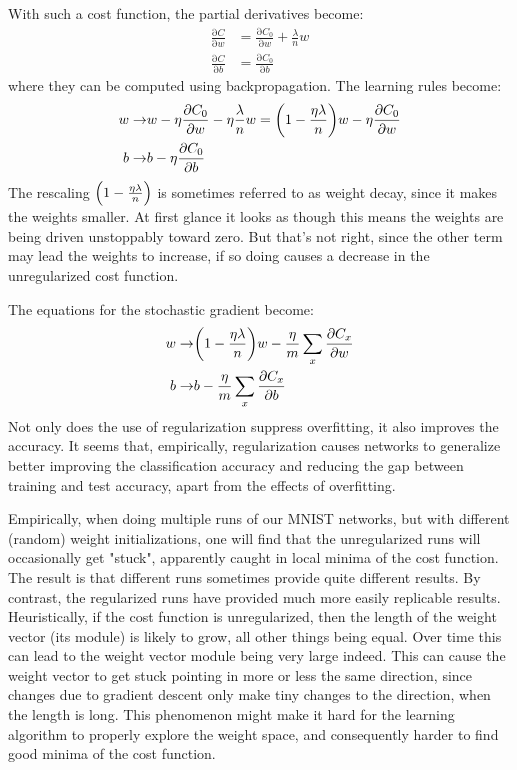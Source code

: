 \documentclass[12pt, letterpaper]{article}
\theoremstyle{definition}
\DeclarePairedDelimiter\autobracket{(}{)}
\newcommand{\br}[1]{\autobracket*{#1}}
\newcommand{\pr}{\mathrm{\partial}}
\begin{document}
With such a cost function, the partial derivatives become:
\begin{equation}
\begin{aligned}
\frac{\pr C}{\pr w} &=\frac{\pr C_0}{\pr w}  + \frac{\lambda}{n} w \\
\frac{\pr C}{\pr b} &=\frac{\pr C_0}{\pr b}
\end{aligned}
\end{equation}
where they can be computed using backpropagation. The learning rules become:
\begin{equation}
\begin{aligned}
w\rightarrow &w -\eta \frac{\pr C_0}{\pr w} -\eta \frac{\lambda}{n} w = \br{1-\frac{\eta\lambda}{n}}w-\eta \frac{\pr C_0}{\pr w} \\
b\rightarrow &b- \eta \frac{\pr C_0}{\pr b}
\end{aligned}
\end{equation}
The rescaling $\br{1-\frac{\eta\lambda}{n}}$ is sometimes referred to as weight decay, since it makes the weights smaller. At first glance it looks as though this means the weights are being driven unstoppably toward zero. But that's not right, since the other term may lead the weights to increase, if so doing causes a decrease in the unregularized cost function.

The equations for the stochastic gradient become:
\begin{equation}
\begin{aligned}
w\rightarrow & \br{1-\frac{\eta\lambda}{n}}w-\frac{\eta}{m} \sum_x\frac{\pr C_x}{\pr w} \\
b\rightarrow &b-\frac{\eta}{m} \sum_x\frac{\pr C_x}{\pr b}
\end{aligned}
\end{equation}
Not only does the use of regularization suppress overfitting, it also improves the accuracy. It seems that, empirically, regularization causes networks to generalize better improving the classification accuracy and reducing the gap between training and test accuracy, apart from the effects of overfitting.

Empirically, when doing multiple runs of our MNIST networks, but with different (random) weight initializations, one will find that the unregularized runs will occasionally get "stuck", apparently caught in local minima of the cost function. The result is that different runs sometimes provide quite different results. By contrast, the regularized runs have provided much more easily replicable results. Heuristically, if the cost function is unregularized, then the length of the weight vector (its module) is likely to grow, all other things being equal. Over time this can lead to the weight vector module being very large indeed. This can cause the weight vector to get stuck pointing in more or less the same direction, since changes due to gradient descent only make tiny changes to the direction, when the length is long. This phenomenon might make it hard for the learning algorithm to properly explore the weight space, and consequently harder to find good minima of the cost function.
\end{document}
